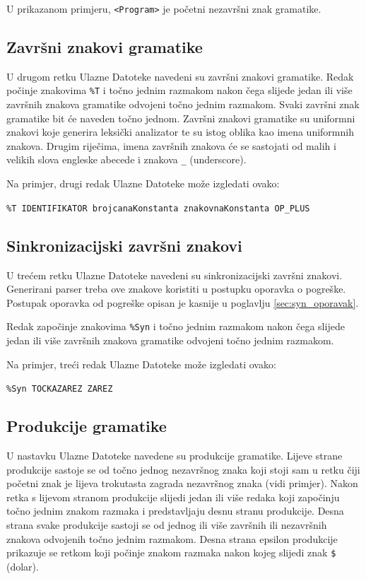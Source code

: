 \documentclass[times, 12pt, utf8]{book}
\begin{document}
U prikazanom primjeru, \verb|<Program>| je početni nezavršni znak gramatike.

\subsection{Završni znakovi gramatike}

U drugom retku Ulazne Datoteke navedeni su završni znakovi gramatike.
Redak počinje znakovima \verb|%T| i točno jednim razmakom nakon čega slijede jedan ili više završnih znakova gramatike odvojeni točno jednim razmakom.
Svaki završni znak gramatike bit će naveden točno jednom.
Završni znakovi gramatike su uniformni znakovi koje generira leksički analizator te su istog oblika kao imena uniformnih znakova.
Drugim riječima, imena završnih znakova će se sastojati od malih i velikih slova engleske abecede i znakova \verb|_| (underscore).

Na primjer, drugi redak Ulazne Datoteke može izgledati ovako:

\verb|%T IDENTIFIKATOR brojcanaKonstanta znakovnaKonstanta OP_PLUS|

\subsection{Sinkronizacijski završni znakovi}

U trećem retku Ulazne Datoteke navedeni su sinkronizacijski završni znakovi.
Generirani parser treba ove znakove koristiti u postupku oporavka o pogreške.
Postupak oporavka od pogreške opisan je kasnije u poglavlju \ref{sec:syn_oporavak}.

Redak započinje znakovima \verb|%Syn| i točno jednim razmakom nakon čega slijede jedan ili više završnih znakova gramatike odvojeni točno jednim razmakom.

Na primjer, treći redak Ulazne Datoteke može izgledati ovako:

\verb|%Syn TOCKAZAREZ ZAREZ|

\subsection{Produkcije gramatike}
U nastavku Ulazne Datoteke navedene su produkcije gramatike.
Lijeve strane produkcije sastoje se od točno jednog nezavršnog znaka koji stoji sam u retku čiji početni znak je lijeva trokutasta zagrada nezavršnog znaka (vidi primjer).
Nakon retka s lijevom stranom produkcije slijedi jedan ili više redaka koji započinju točno jednim znakom razmaka i predstavljaju desnu stranu produkcije.
Desna strana svake produkcije sastoji se od jednog ili više završnih ili nezavršnih znakova odvojenih točno jednim razmakom.
Desna strana epsilon produkcije prikazuje se retkom koji počinje znakom razmaka nakon kojeg slijedi znak \verb|$| (dolar).
\end{document}
